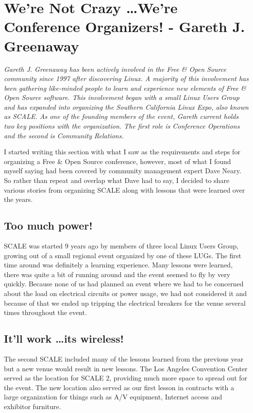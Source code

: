 \chapter{We're Not Crazy \dots We're Conference Organizers! - Gareth J.
Greenaway}

\textit{Gareth J. Greenaway has been actively involved in the Free \& Open Source community since 1997 after discovering Linux. A majority of this involvement has been gathering like-minded people to learn and experience new elements of Free \& Open Source software. This involvement began with a small Linux Users Group and has expanded into organizing the Southern California Linux Expo, also known as SCALE. As one of the founding members of the event, Gareth current holds two key positions with the organization. The first role is Conference Operations and the second is Community Relations.}

I started writing this section with what I saw as the requirements and steps for
organizing a Free \& Open Source conference, however, most of what I found myself saying had been covered by community management expert Dave Neary. So rather than repeat and overlap what Dave had to say, I decided to share various stories from organizing SCALE along with lessons that were learned over the years.

\section*{Too much power!}

SCALE was started 9 years ago by members of three local Linux Users Group,
growing out of a small regional event organized by one of these LUGs. The first
time around was definitely a learning experience. Many lessons were learned,
there was quite a bit of running around and the event seemed to fly by very
quickly. Because none of us had planned an event where we had to be
concerned about the load on electrical circuits or power usage, we had not
considered it and because of that we ended up tripping the electrical breakers
for the venue several times throughout the event.

\section*{It’ll work \dots its wireless!}

The second SCALE included many of the lessons learned from the previous year but
a new venue would result in new lessons. The Los Angeles Convention Center
served as the location for SCALE 2, providing much more space to spread out for
the event. The new location also served as our first lesson in contracts with a
large organization for things such as A/V equipment, Internet access and
exhibitor furniture.  

